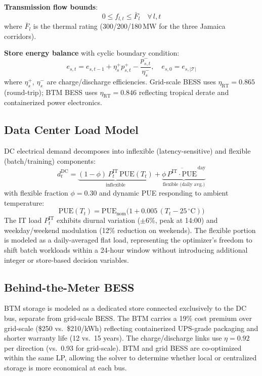 \documentclass[conference,10pt]{IEEEtran}
\begin{document}
\noindent\textbf{Transmission flow bounds}:
\begin{equation}
0 \leq f_{l,t} \leq \bar{F}_l \quad \forall\, l,t
\label{eq:tx}
\end{equation}
where $\bar{F}_l$ is the thermal rating (300/200/180\,MW for the three Jamaica corridors).

\noindent\textbf{Store energy balance} with cyclic boundary condition:
\begin{equation}
e_{s,t} = e_{s,t-1} + \eta_s^{+} p_{s,t}^{+} - \frac{p_{s,t}^{-}}{\eta_s^{-}}, \quad e_{s,0} = e_{s,|\mathcal{T}|}
\label{eq:store}
\end{equation}
where $\eta_s^{+}$, $\eta_s^{-}$ are charge/discharge efficiencies. Grid-scale BESS uses $\eta_{\text{RT}} = 0.865$ (round-trip); BTM BESS uses $\eta_{\text{RT}} = 0.846$ reflecting tropical derate and containerized power electronics.

\subsection{Data Center Load Model}

DC electrical demand decomposes into inflexible (latency-sensitive) and flexible (batch/training) components:
\begin{equation}
d_t^{\text{DC}} = \underbrace{(1-\phi)\, P_t^{\text{IT}}\, \text{PUE}(T_t)}_{\text{inflexible}} + \underbrace{\phi\, \overline{P^{\text{IT}} \cdot \text{PUE}}^{\,\text{day}}}_{\text{flexible (daily avg.)}}
\label{eq:dc}
\end{equation}
with flexible fraction $\phi=0.30$ and dynamic PUE responding to ambient temperature:
\begin{equation}
\text{PUE}(T_t) = \text{PUE}_{\text{nom}}\bigl(1 + 0.005\,(T_t - 25\,^\circ\text{C})\bigr)
\label{eq:pue}
\end{equation}
The IT load $P_t^{\text{IT}}$ exhibits diurnal variation ($\pm 6\%$, peak at 14:00) and weekday/weekend modulation (12\% reduction on weekends). The flexible portion is modeled as a daily-averaged flat load, representing the optimizer's freedom to shift batch workloads within a 24-hour window without introducing additional integer or store-based decision variables.

\subsection{Behind-the-Meter BESS}

BTM storage is modeled as a dedicated store connected exclusively to the DC bus, separate from grid-scale BESS. The BTM carries a 19\% cost premium over grid-scale (\$250 vs.\ \$210/kWh) reflecting containerized UPS-grade packaging and shorter warranty life (12 vs.\ 15 years). The charge/discharge links use $\eta=0.92$ per direction (vs.\ 0.93 for grid-scale). BTM and grid BESS are co-optimized within the same LP, allowing the solver to determine whether local or centralized storage is more economical at each bus.
\end{document}
